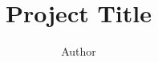 \documentclass[11pt]{article}
\begin{document}
    \title{Project Title}
    \author{Author}
    \maketitle



    


    
\end{document}
